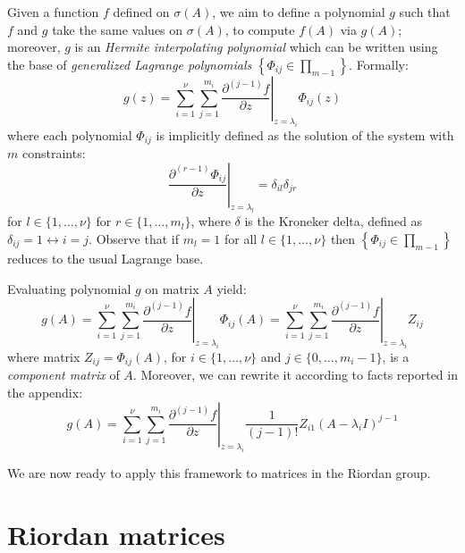 Given a function $f$ defined on $\sigma(A)$, we aim to define a polynomial $g$
such that $f$ and $g$ take the same values on $\sigma(A)$, to compute $f(A)$
via $g(A)$; moreover, $g$ is an \emph{Hermite interpolating polynomial} which
can be written using the base of \textit{generalized Lagrange polynomials}
$\left\lbrace \Phi_{ij}\in\prod_{m-1} \right\rbrace$. Formally:
\begin{displaymath}
g(z) = \sum_{i=1}^{\nu}{\sum_{j=1}^{m_{i}}{ \left.
\frac{\partial^{(j-1)}{f}}{\partial{z}} \right|_{z=\lambda_{i}}\Phi_{ij}(z) }}
\end{displaymath}
where each polynomial $\Phi_{ij}$ is implicitly defined as the solution of the
system with $m$ constraints:
\begin{displaymath}
    \left. \frac{\partial^{(r-1)}{\Phi_{ij}}}{\partial{z}} \right|_{z=\lambda_{l}} = \delta_{il}\delta_{jr}
\end{displaymath}
for $l\in \lbrace 1, \ldots, \nu \rbrace$ for $r \in \lbrace 1, \ldots, m_{l}
\rbrace$, where $\delta$ is the Kroneker delta, defined as $\delta_{ij}=1
\leftrightarrow i=j$.  Observe that if $m_{l}=1$ for all $l\in\lbrace 1,
\ldots, \nu\rbrace$ then $\left\lbrace \Phi_{ij}\in\prod_{m-1} \right\rbrace$
reduces to the usual Lagrange base.

Evaluating polynomial $g$ on matrix $A$ yield:
\begin{displaymath}
g(A) = \sum_{i=1}^{\nu}{\sum_{j=1}^{m_{i}}{ \left.  \frac{\partial^{(j-1)}{f}}{\partial{z}} \right|_{z=\lambda_{i}}\Phi_{ij}(A) }}
     = \sum_{i=1}^{\nu}{\sum_{j=1}^{m_{i}}{ \left.  \frac{\partial^{(j-1)}{f}}{\partial{z}} \right|_{z=\lambda_{i}}Z_{ij} }}
\end{displaymath}
where matrix $Z_{ij}=\Phi_{ij}(A)$, for $i\in \lbrace 1, \ldots, \nu \rbrace$
and $j \in \lbrace 0, \ldots, m_{i}-1 \rbrace$, is a \textit{component matrix}
of $A$. Moreover, we can rewrite it according to facts reported in the appendix:
\begin{displaymath}
g(A) = \sum_{i=1}^{\nu}{\sum_{j=1}^{m_{i}}{ \left.  \frac{\partial^{(j-1)}{f}}{\partial{z}} \right|_{z=\lambda_{i}}\frac{1}{(j-1)!}{Z_{i1}(A-\lambda_{i}I)^{j-1}} }}
\end{displaymath}

We are now ready to apply this framework to matrices in the Riordan group.

\section*{Riordan matrices}

